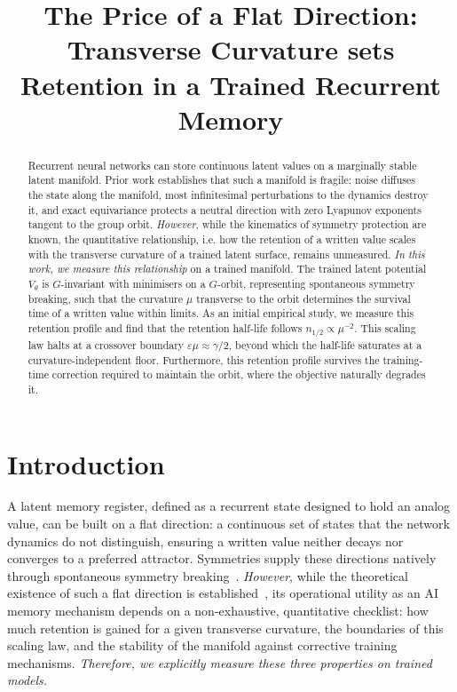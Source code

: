 \documentclass[mlabstract,onecolumn]{jmlr}
\title[The Price of a Flat Direction]{The Price of a Flat Direction: Transverse Curvature sets Retention in a Trained Recurrent Memory}
\begin{document}
\maketitle
\begin{abstract}
Recurrent neural networks can store continuous latent values on a marginally stable latent manifold. Prior work establishes that such a manifold is fragile: noise diffuses the state along the manifold, most infinitesimal perturbations to the dynamics destroy it, and exact equivariance protects a neutral direction with zero Lyapunov exponents tangent to the group orbit. \emph{However}, while the kinematics of symmetry protection are known, the quantitative relationship, i.e. how the retention of a written value scales with the transverse curvature of a trained latent surface, remains unmeasured. \emph{In this work, we measure this relationship} on a trained manifold. The trained latent potential $V_\theta$ is $G$-invariant with minimisers on a $G$-orbit, representing spontaneous symmetry breaking, such that the curvature $\mu$ transverse to the orbit determines the survival time of a written value within limits. As an initial empirical study, we measure this retention profile and find that the retention half-life follows $n_{1/2}\propto\mu^{-2}$. This scaling law halts at a crossover boundary $\varepsilon\mu\approx\gamma/2$, beyond which the half-life saturates at a curvature-independent floor. Furthermore, this retention profile survives the training-time correction required to maintain the orbit, where the objective naturally degrades it.
\end{abstract}

\section{Introduction}\label{sec:intro}

A latent memory register, defined as a recurrent state designed to hold an analog value, can be built on a flat direction: a continuous set of states that the network dynamics do not distinguish, ensuring a written value neither decays nor converges to a preferred attractor. Symmetries supply these directions natively through spontaneous symmetry breaking~\citep{iqbal_spontaneous_2026}. \emph{However}, while the theoretical existence of such a flat direction is established~\citep{golubitsky_singularities_1988,krupa_bifurcations_1990,rumberger_lyapunov_2001,mo_symmetry-protected_2026}, its operational utility as an AI memory mechanism depends on a non-exhaustive, quantitative checklist: how much retention is gained for a given transverse curvature, the boundaries of this scaling law, and the stability of the manifold against corrective training mechanisms. \emph{Therefore, we explicitly measure these three properties on trained models.}
\end{document}
